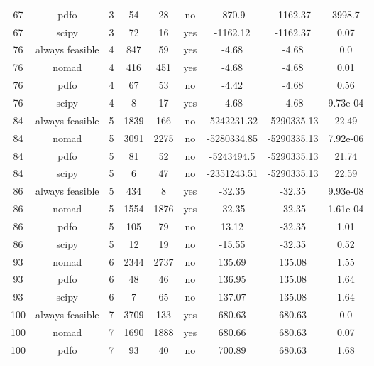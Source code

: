 \begin{footnotesize}
\begin{center}
\begin{longtable}{ccccccccc}
 67 &            pdfo &  3 &     54 &     28 &      no &      -870.9 &    -1162.37 &   3998.7\\
 67 &           scipy &  3 &     72 &     16 &     yes &    -1162.12 &    -1162.37 &     0.07\\
 76 & always feasible &  4 &    847 &     59 &     yes &       -4.68 &       -4.68 &      0.0\\
 76 &           nomad &  4 &    416 &    451 &     yes &       -4.68 &       -4.68 &     0.01\\
 76 &            pdfo &  4 &     67 &     53 &      no &       -4.42 &       -4.68 &     0.56\\
 76 &           scipy &  4 &      8 &     17 &     yes &       -4.68 &       -4.68 & 9.73e-04\\
 84 & always feasible &  5 &   1839 &    166 &      no & -5242231.32 & -5290335.13 &    22.49\\
 84 &           nomad &  5 &   3091 &   2275 &      no & -5280334.85 & -5290335.13 & 7.92e-06\\
 84 &            pdfo &  5 &     81 &     52 &      no &  -5243494.5 & -5290335.13 &    21.74\\
 84 &           scipy &  5 &      6 &     47 &      no & -2351243.51 & -5290335.13 &    22.59\\
 86 & always feasible &  5 &    434 &      8 &     yes &      -32.35 &      -32.35 & 9.93e-08\\
 86 &           nomad &  5 &   1554 &   1876 &     yes &      -32.35 &      -32.35 & 1.61e-04\\
 86 &            pdfo &  5 &    105 &     79 &      no &       13.12 &      -32.35 &     1.01\\
 86 &           scipy &  5 &     12 &     19 &      no &      -15.55 &      -32.35 &     0.52\\
 93 &           nomad &  6 &   2344 &   2737 &      no &      135.69 &      135.08 &     1.55\\
 93 &            pdfo &  6 &     48 &     46 &      no &      136.95 &      135.08 &     1.64\\
 93 &           scipy &  6 &      7 &     65 &      no &      137.07 &      135.08 &     1.64\\
100 & always feasible &  7 &   3709 &    133 &     yes &      680.63 &      680.63 &      0.0\\
100 &           nomad &  7 &   1690 &   1888 &     yes &      680.66 &      680.63 &     0.07\\
100 &            pdfo &  7 &     93 &     40 &      no &      700.89 &      680.63 &     1.68\\

\end{longtable}
\end{center}
\end{footnotesize}
